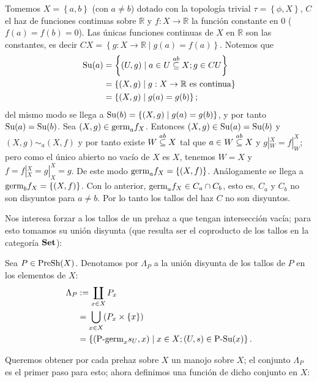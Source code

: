 \begin{Ejm}
   Tomemos $X=\left\lbrace a,b\right\rbrace$ (con $a\neq b$) dotado con la topología trivial $\tau=\left\lbrace \phi,X\right\rbrace$, $C$ el haz de funciones continuas sobre $\mathbb{R}$ y $f:X\to \mathbb{R}$ la función constante en $0$ ($f(a)=f(b)=0$). Las únicas funciones continuas de $X$ en $\mathbb{R}$ son las constantes, es decir $CX=\left\lbrace g:X\to\mathbb{R}\mid g(a)=f(a)\right\rbrace$. Notemos que
   $$
   \begin{aligned}
      \normalfont{\text{Su}}(a)&=\left\lbrace (U,g)\mid a\in U\stackrel{ab}{\subseteq} X;g\in CU\right\rbrace\\
            &=\left\lbrace (X,g)\mid g:X\to\mathbb{R} \text{ es continua}\right\rbrace\\
            &=\left\lbrace (X,g)\mid g(a)=g(b)\right\rbrace;\\
   \end{aligned}
   $$
   del mismo modo se llega a $\normalfont{\text{Su}}(b)=\left\lbrace (X,g)\mid g(a)=g(b)\right\rbrace$, y por tanto $\normalfont{\text{Su}}(a)=\normalfont{\text{Su}}(b)$. Sea $(X,g)\in\normalfont{\text{germ}}_{a}f_{X}$. Entonces $(X,g)\in\normalfont{\text{Su}}(a)=\normalfont{\text{Su}}(b)$ y $(X,g)\sim_{a}(X,f)$ y por tanto existe $W\stackrel{ab}{\subseteq} X$ tal que $a\in W\stackrel{ab}{\subseteq} X$ y $g|^{X}_{W}=f|^{X}_{W}$; pero como el único abierto no vacío de $X$ es $X$, tenemos $W=X$ y $f=f|^{X}_{X}=g|^{X}_{X}=g$. De este modo $\normalfont{\text{germ}}_{a}f_{X}=\left\lbrace (X,f)\right\rbrace$. Análogamente se llega a $\normalfont{\text{germ}}_{b}f_{X}=\left\lbrace (X,f)\right\rbrace$. Con lo anterior, $\normalfont{\text{germ}}_{a}f_{X}\in C_{a}\cap C_{b}$, esto es, $C_a$ y $C_b$ no son disyuntos para $a\neq b$. Por lo tanto los tallos del haz $C$ no son disyuntos.
\end{Ejm}
Nos interesa forzar a los tallos de un prehaz a que tengan intersección vacía; para esto tomamos su unión disyunta (que resulta ser el coproducto de los tallos en la categoría $\normalfont{\textbf{Set}}$):
\begin{Def}
   Sea $P\in\normalfont{\text{PreSh}}(X)$. Denotamos por $\Lambda_P$ a la unión disyunta de los tallos de $P$ en los elementos de $X$:
   $$
   \begin{aligned}
      \Lambda_P&:=\coprod_{x\in X}P_{x}\\
               &=\bigcup_{x\in X}(P_{x}\times\left\lbrace x\right\rbrace)\\
               &=\left\lbrace (\normalfont{\text{P-germ}}_{x}s_{U},x)\mid x\in X;(U,s)\in\normalfont{\text{P-Su}}(x)\right\rbrace.
   \end{aligned}
   $$
\end{Def}
Queremos obtener por cada prehaz sobre $X$ un manojo sobre $X$; el conjunto $\Lambda_P$ es el primer paso para esto; ahora definimos una función de dicho conjunto en $X$:
